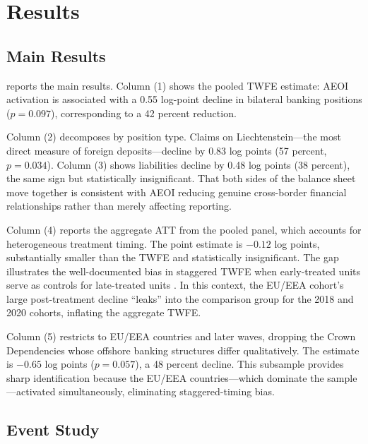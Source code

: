 \documentclass[12pt]{article}
\begin{document}
\section{Results}

\subsection{Main Results}



 reports the main results. Column (1) shows the pooled TWFE estimate: AEOI activation is associated with a 0.55 log-point decline in bilateral banking positions ($p = 0.097$), corresponding to a 42 percent reduction.

Column (2) decomposes by position type. Claims on Liechtenstein---the most direct measure of foreign deposits---decline by 0.83 log points (57 percent, $p = 0.034$). Column (3) shows liabilities decline by 0.48 log points (38 percent), the same sign but statistically insignificant. That both sides of the balance sheet move together is consistent with AEOI reducing genuine cross-border financial relationships rather than merely affecting reporting.

Column (4) reports the \citet{sun2021estimating} aggregate ATT from the pooled panel, which accounts for heterogeneous treatment timing. The point estimate is $-0.12$ log points, substantially smaller than the TWFE and statistically insignificant. The gap illustrates the well-documented bias in staggered TWFE when early-treated units serve as controls for late-treated units \citep{goodman2021difference}. In this context, the EU/EEA cohort's large post-treatment decline ``leaks'' into the comparison group for the 2018 and 2020 cohorts, inflating the aggregate TWFE.

Column (5) restricts to EU/EEA countries and later waves, dropping the Crown Dependencies whose offshore banking structures differ qualitatively. The estimate is $-0.65$ log points ($p = 0.057$), a 48 percent decline. This subsample provides sharp identification because the EU/EEA countries---which dominate the sample---activated simultaneously, eliminating staggered-timing bias.

\subsection{Event Study}


\end{document}
